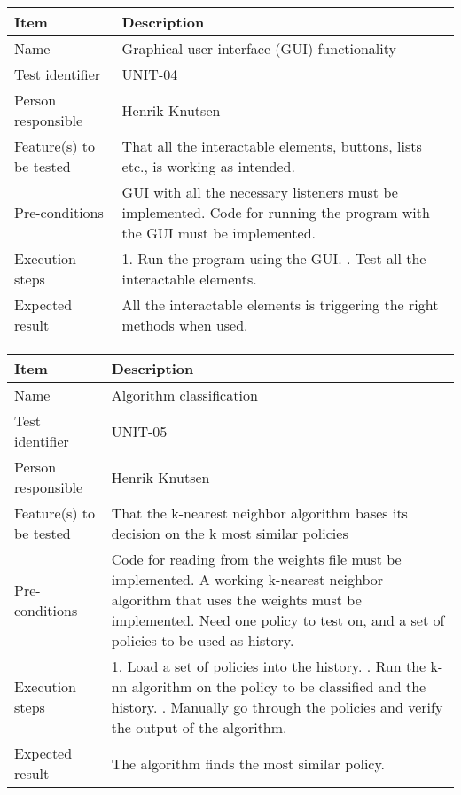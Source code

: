 \documentclass[12pt, fullpage, oneside]{report}
\begin{document}
		\begin{center}
			\begin{tabular}{ |  p{3.5cm} | p{10cm} | }
				\hline
				Item & Description \\ [5pt] \hline \hline
				Name & Graphical user interface (GUI) functionality \\  [5pt] \hline
				Test identifier & UNIT-04 \\  [5pt] \hline
				Person responsible & Henrik Knutsen \\  [5pt] \hline
				Feature(s) to be tested & That all the interactable elements, buttons, lists etc., is working as intended. \\  [5pt] \hline
				Pre-conditions & GUI with all the necessary listeners must be implemented. Code for running the program with the GUI must be implemented. \\  [5pt] \hline
				Execution steps & 1. Run the program using the GUI. \newline 2. Test all the interactable elements. \\  [5pt] \hline
				Expected result & All the interactable elements is triggering the right methods when used. \\  [5pt] \hline
			\end{tabular}
		\end{center}

		\begin{center}
			\begin{tabular}{ |  p{3.5cm} | p{10cm} | }
				\hline
				Item & Description \\ [5pt] \hline \hline
				Name & Algorithm classification \\  [5pt] \hline
				Test identifier & UNIT-05 \\  [5pt] \hline
				Person responsible & Henrik Knutsen \\  [5pt] \hline
				Feature(s) to be tested & That the k-nearest neighbor algorithm bases its decision on the k most similar policies \\  [5pt] \hline
				Pre-conditions & Code for reading from the weights file must be implemented. A working k-nearest neighbor algorithm that uses the weights must be implemented. Need one policy to test on, and a set of policies to be used as history. \\  [5pt] \hline
				Execution steps & 1. Load a set of policies into the history. \newline 2. Run the k-nn algorithm on the policy to be classified and the history. \newline 3. Manually go through the policies and verify the output of the algorithm. \\  [5pt] \hline
				Expected result & The algorithm finds the most similar policy. \\  [5pt] \hline
			\end{tabular}
		\end{center}
\end{document}
